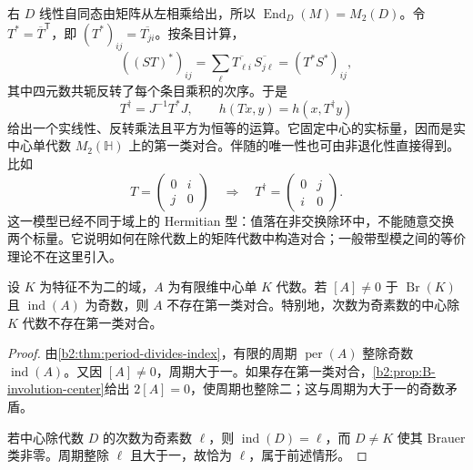 右 \(D\) 线性自同态由矩阵从左相乘给出，所以 \(\operatorname{End}_D(M)=M_2(D)\)。令 \(T^*=\overline T^{\mathsf T}\)，即 \((T^*)_{ij}=\overline{T_{ji}}\)。按条目计算，
\[
	((ST)^*)_{ij} =\sum_{\ell}\overline{T_{\ell i}}\,\overline{S_{j\ell}} =(T^*S^*)_{ij},
\]
其中四元数共轭反转了每个条目乘积的次序。于是
\[
	T^\dagger=J^{-1}T^*J,\qquad h(Tx,y)=h(x,T^\dagger y)
\]
给出一个实线性、反转乘法且平方为恒等的运算。它固定中心的实标量，因而是实中心单代数 \(M_2(\mathbb H)\) 上的第一类对合。伴随的唯一性也可由非退化性直接得到。比如
\[
	T=\begin{pmatrix}0&i\\j&0\end{pmatrix}
	\quad\Longrightarrow\quad
	T^\dagger=\begin{pmatrix}0&j\\i&0\end{pmatrix}.
\]
这一模型已经不同于域上的 Hermitian 型：值落在非交换除环中，不能随意交换两个标量。它说明如何在除代数上的矩阵代数中构造对合；一般带型模之间的等价理论不在这里引入。

\begin{corollary}\label{b2:cor:B-odd-index-no-involution}
	设 \(K\) 为特征不为二的域，\(A\) 为有限维中心单 \(K\) 代数。若 \([A]\ne0\) 于 \(\operatorname{Br}(K)\) 且 \(\operatorname{ind}(A)\) 为奇数，则 \(A\) 不存在第一类对合。特别地，次数为奇素数的中心除 \(K\) 代数不存在第一类对合。
\end{corollary}
\begin{proof}
	由\cref{b2:thm:period-divides-index}，有限的周期 \(\operatorname{per}(A)\) 整除奇数 \(\operatorname{ind}(A)\)。又因 \([A]\ne0\)，周期大于一。如果存在第一类对合，\cref{b2:prop:B-involution-center}给出 \(2[A]=0\)，使周期也整除二；这与周期为大于一的奇数矛盾。

	若中心除代数 \(D\) 的次数为奇素数 \(\ell\)，则 \(\operatorname{ind}(D)=\ell\)，而 \(D\ne K\) 使其 Brauer 类非零。周期整除 \(\ell\) 且大于一，故恰为 \(\ell\)，属于前述情形。
\end{proof}

